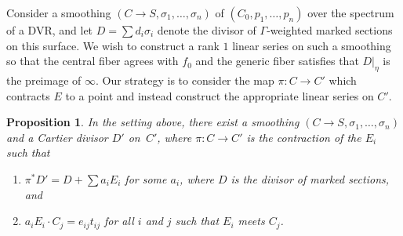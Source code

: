 \documentclass[11pt]{amsart}
\numberwithin{equation}{section}
\newtheorem{prop}[theorem]{Proposition}
\theoremstyle{definition}
\theoremstyle{remark}
\begin{document}
Consider a smoothing $(C \to S, \sigma_1, \ldots, \sigma_n)$ of $(C_0, p_1, \ldots, p_n)$ over the spectrum of a DVR, and let $D = \sum d_i \sigma_i$ denote the divisor of $\Gamma$-weighted marked sections on this surface. We wish to construct a rank $1$ linear series on such a smoothing so that the central fiber agrees with $f_0$ and the generic fiber satisfies that $D|_\eta$ is the preimage of $\infty$. Our strategy is to consider the map $\pi \colon C \to C'$ which contracts $E$ to a point and instead construct the appropriate linear series on $C'$. 

\begin{prop}\label{prop:sufficient} In the setting above, there exist a smoothing $(C \to S, \sigma_1, \ldots, \sigma_n)$ and a Cartier divisor $D'$ on~$C'$, where $\pi \colon C \to C'$ is the contraction of the $E_i$
  such that
\begin{enumerate} 
\item $\pi^*D' = D + \sum a_iE_i$ for some $a_i$, where $D$ is the divisor of marked sections, and
\item $a_iE_i\cdot C_j = e_{ij}t_{ij}$ for all $i$ and $j$ such that $E_i$ meets $C_j$. 
\end{enumerate}
\end{prop}
\end{document}
